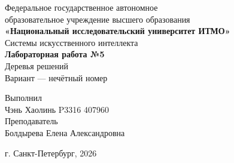 \begin{titlepage}
    \centering
    Федеральное государственное автономное\\
    образовательное учреждение высшего образования\\
    \textbf{«Национальный исследовательский университет ИТМО»}\\
    \vfill
    Системы искусственного интеллекта\\
    \vspace{0.5\baselineskip}
    \textbf{Лабораторная работа №5}\\
    \vspace{0.5\baselineskip}
    Деревья решений\\
    \vspace{0.5\baselineskip}
    Вариант --- нечётный номер\\
    \vfill
    \begin{flushright}
    Выполнил\\
    Чэнь Хаолинь P3316 407960\\[0.5\baselineskip]
    Преподаватель\\
    Болдырева Елена Александровна
    \end{flushright}
    \vspace{4\baselineskip}
    г. Санкт-Петербург, 2026
\end{titlepage}
